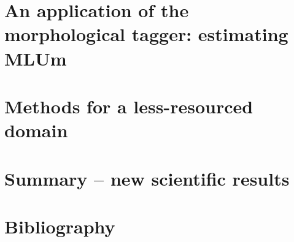 \documentclass[a4paper,11pt,oneside,times,numbered,custommargin,custombib,PageStyleII]{Classes/PhDThesisPSnPDF}
\begin{document}
\chapter{An application of the morphological tagger: estimating MLUm}


\chapter{Methods for a less-resourced domain}


\chapter{Summary -- new scientific results}


\chapter*{Bibliography}



\end{document}
